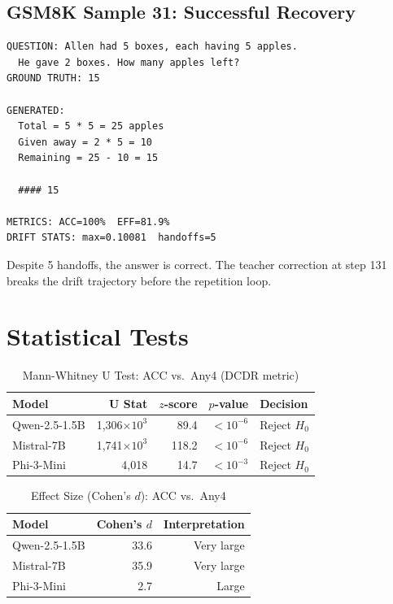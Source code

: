 \documentclass{uai2026}  %
\begin{document}
\subsection{GSM8K Sample 31: Successful Recovery}

\begin{lstlisting}[caption={GSM8K Sample 31 -- Successful Recovery}]
QUESTION: Allen had 5 boxes, each having 5 apples.
  He gave 2 boxes. How many apples left?
GROUND TRUTH: 15

GENERATED:
  Total = 5 * 5 = 25 apples
  Given away = 2 * 5 = 10
  Remaining = 25 - 10 = 15

  #### 15

METRICS: ACC=100%  EFF=81.9%
DRIFT STATS: max=0.10081  handoffs=5
\end{lstlisting}

Despite 5 handoffs, the answer is correct. The teacher correction
at step 131 breaks the drift trajectory before the repetition loop.

\section{Statistical Tests}
\label{app:stats}

\begin{table}[H]
\centering
\caption{Mann-Whitney U Test: ACC vs.\ Any4 (DCDR metric)}
\begin{tabular}{@{}lrrrl@{}}
\toprule
\textbf{Model} & \textbf{U Stat} & \textbf{$z$-score} & \textbf{$p$-value} & \textbf{Decision} \\
\midrule
Qwen-2.5-1.5B & 1,306$\times 10^3$ & 89.4 & $<10^{-6}$ & Reject $H_0$ \\
Mistral-7B    & 1,741$\times 10^3$ & 118.2 & $<10^{-6}$ & Reject $H_0$ \\
Phi-3-Mini    & 4,018              & 14.7  & $<10^{-3}$ & Reject $H_0$ \\
\bottomrule
\end{tabular}
\end{table}

\begin{table}[H]
\centering
\caption{Effect Size (Cohen's $d$): ACC vs.\ Any4}
\begin{tabular}{@{}lrr@{}}
\toprule
\textbf{Model} & \textbf{Cohen's $d$} & \textbf{Interpretation} \\
\midrule
Qwen-2.5-1.5B & 33.6 & Very large \\
Mistral-7B    & 35.9 & Very large \\
Phi-3-Mini    & 2.7  & Large \\
\bottomrule
\end{tabular}
\end{table}
\end{document}
